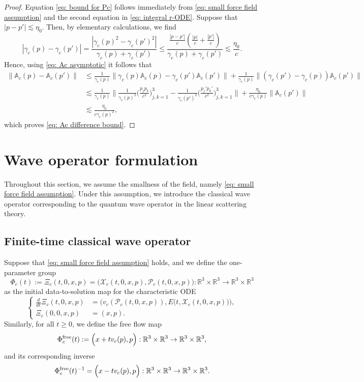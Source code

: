 \documentclass[reqno, 11pt, letterpaper]{amsart}
\theoremstyle{remark}
\numberwithin{equation}{section}
\numberwithin{theorem}{section}
\numberwithin{table}{section}
\numberwithin{figure}{section}
\begin{document}
\begin{proof}
Equation \eqref{eq: bound for Pc} follows immediately from \eqref{eq: small force field assumption} and the second equation in \eqref{eq: integral r-ODE}. 
%
Suppose that $|p-p'|\lesssim\eta_0$. Then, by elementary calculations, we find
$$|\gamma_c(p)-\gamma_c(p')|=\frac{|\gamma_c(p)^2-\gamma_c(p')^2|}{\gamma_c(p)+\gamma_c(p')}\leq\frac{\frac{|p-p'|}{c}(\frac{|p|}{c}+\frac{|p'|}{c})}{\gamma_c(p)+\gamma_c(p')}\lesssim\frac{\eta_0}{c}.$$
Hence, using \eqref{eq: Ac asymptotic} it follows that 
$$\begin{aligned}
\|\mathbb{A}_c(p)-\mathbb{A}_c(p')\|&\leq\frac{1}{\gamma_c(p)}\|\gamma_c(p)\mathbb{A}_c(p)-\gamma_c(p')\mathbb{A}_c(p')\|+\frac{1}{\gamma_c(p)}\|(\gamma_c(p')-\gamma_c(p))\mathbb{A}_c(p')\|\\
&\lesssim\frac{1}{\gamma_c(p)}\bigg\|\frac{1}{\gamma_c(p)^2}\bigg(\frac{p_j p_k}{c^2}\bigg)_{j,k=1}^3-\frac{1}{\gamma_c(p')^2}\bigg(\frac{p_j' p_k'}{c^2}\bigg)_{j,k=1}^3\bigg\|+\frac{\eta_0}{c\gamma_c(p)}\|\mathbb{A}_c(p')\|\\
&\lesssim\frac{\eta_0}{c\gamma_c(p)^2},
\end{aligned}$$
which proves \eqref{eq: Ac difference bound}.
\end{proof}


\section{Wave operator formulation}\label{sec: Wave operator formulation}

Throughout this section, we assume the smallness of the field, namely \eqref{eq: small force field assumption}. 
Under this assumption, we introduce the classical wave operator corresponding to the quantum wave operator in the linear scattering theory. 



\subsection{Finite-time classical wave operator}\label{sec: Finite-time classical wave operator}

Suppose that \eqref{eq: small force field assumption} holds, and we define the one-parameter group 
$$\Phi_c(t):=\Xi_c(t,0,x,p)=\big(\mathcal{X}_c(t,0, x,p), \mathcal{P}_c(t,0, x,p)\big): \mathbb{R}^3\times \mathbb{R}^3\to\mathbb{R}^3\times \mathbb{R}^3$$
as the initial data-to-solution map for the characteristic ODE
\begin{equation}\label{eq: forward characteristic ODE}
\left\{\begin{aligned}
\frac{d}{dt}\Xi_c(t,0,x,p)&=\Big(v_c (\mathcal{P}_c(t,0, x,p)), E\big(t,\mathcal{X}_c(t,0,x,p)\big)\Big),\\
\Xi_c(0,0,x,p)&=(x,p).
\end{aligned}\right.
\end{equation}
Similarly, for all $t \geq 0$, we define the free flow map
$$\Phi_c^{\textup{free}}(t):=\Big(x + tv_c(p), p\Big): \mathbb{R}^3\times \mathbb{R}^3\to\mathbb{R}^3\times \mathbb{R}^3,$$
and its corresponding inverse
$$\Phi_c^{\textup{free}}(t)^{-1}= \Big(x - tv_c(p), p\Big): \mathbb{R}^3\times \mathbb{R}^3\to\mathbb{R}^3\times \mathbb{R}^3.$$
\end{document}
